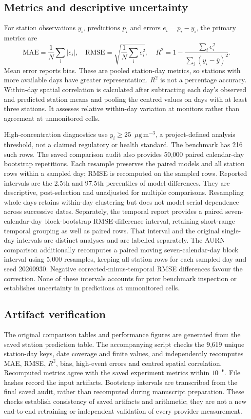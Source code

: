 \documentclass[11pt,a4paper]{article}
\newcommand{\ug}{\ensuremath{\mu\mathrm{g}\,\mathrm{m}^{-3}}}
\begin{document}
\subsection{Metrics and descriptive uncertainty}
For station observations $y_i$, predictions $p_i$ and errors $e_i=p_i-y_i$,
the primary metrics are
\begin{equation}
 \mathrm{MAE}=\frac{1}{N}\sum_i|e_i|,\quad
 \mathrm{RMSE}=\sqrt{\frac{1}{N}\sum_i e_i^2},\quad
 R^2=1-\frac{\sum_i e_i^2}{\sum_i(y_i-\bar y)^2}.
\end{equation}
Mean error reports bias. These are pooled station-day metrics, so stations with
more available days have greater representation. $R^2$ is not a percentage
accuracy. Within-day spatial correlation is calculated after subtracting each
day's observed and predicted station means and pooling the centred values on
days with at least three stations. It assesses relative within-day variation
at monitors rather than agreement at unmonitored cells.

High-concentration diagnostics use $y_i\geq25$~\ug, a project-defined analysis
threshold, not a claimed regulatory or health standard. The benchmark has
216 such rows. The saved comparison audit also provides 50,000 paired
calendar-day bootstrap repetitions. Each resample preserves the paired models
and all station rows within a sampled day; RMSE is recomputed on the sampled
rows. Reported intervals are the 2.5th and 97.5th percentiles of model
differences. They are descriptive, post-selection and unadjusted for multiple
comparisons. Resampling whole days retains within-day clustering but does not
model serial dependence across successive dates. Separately, the temporal
report provides a paired seven-calendar-day block-bootstrap RMSE-difference
interval, retaining short-range temporal grouping as well as paired rows.
That interval and the original single-day intervals are distinct analyses and
are labelled separately. The AURN comparison additionally recomputes a paired
moving seven-calendar-day block interval using 5,000 resamples, keeping all
station rows for each sampled day and seed 20260930. Negative
corrected-minus-temporal RMSE differences favour the correction. None of these
intervals accounts for prior benchmark inspection or
establishes uncertainty in predictions at unmonitored cells.

\subsection{Artifact verification}
The original comparison tables and performance figures are generated from the
saved station prediction table. The accompanying script checks the 9,619 unique
station-day keys, date coverage and finite values, and independently recomputes
MAE, RMSE, $R^2$, bias, high-event errors and centred spatial correlation.
Recomputed metrics agree with the saved experiment metrics within $10^{-6}$.
File hashes record the input artifacts. Bootstrap intervals are transcribed
from the final saved audit, rather than recomputed during manuscript
preparation. These checks establish consistency of saved artifacts and
arithmetic; they are not a new end-to-end retraining or independent validation
of every provider measurement.
\end{document}
